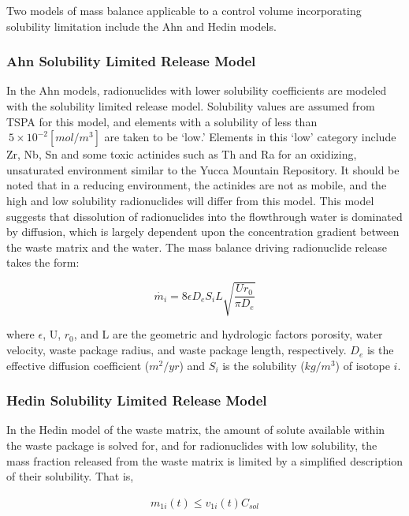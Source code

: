\documentclass[letterpaper]{article}
\begin{document}
Two models of mass balance applicable to a control volume incorporating 
solubility
limitation include the Ahn and Hedin models.

\subsubsection{Ahn Solubility Limited Release Model}

In the Ahn models, radionuclides with lower solubility coefficients are modeled 
with
the solubility limited release model.  Solubility values are assumed from TSPA
for this model, and elements with a solubility of less than $~5\times 10^{-2}
[mol/m^3]$ are taken to be
`low.' Elements in this `low' category include Zr, Nb, Sn and some toxic 
actinides such as Th and Ra for an oxidizing, unsaturated environment similar to 
the Yucca Mountain Repository.
It should be noted that in a reducing environment, the actinides are not as 
mobile, and the high and low solubility radionuclides will differ from this 
model.
This model suggests that dissolution of radionuclides into the flowthrough water 
is dominated by diffusion, which is largely dependent upon the concentration 
gradient between the waste matrix and the water. The mass balance driving 
radionuclide release takes the form:

\begin{equation}
 \dot{m_i}=8\epsilon D_eS_iL\sqrt{\frac{Ur_0}{\pi D_e}}
\end{equation} 

where $\epsilon$, U, $r_0$, and L are the geometric and
hydrologic factors porosity, water velocity, waste package radius, and waste
package length, respectively. $D_e$ is the effective diffusion coefficient
($m^2/yr$)  and $S_i$ is the solubility ($kg/m^3$) of isotope $i$.


\subsubsection{Hedin Solubility Limited Release Model}

In the Hedin model of the waste matrix, the amount of solute available within
the waste package is solved for, and for radionuclides with low solubility, the 
mass
fraction released from the waste matrix is limited by a simplified description
of their solubility. That is, 

\begin{align} m_{1i}(t)\le v_{1i}(t)C_{sol}
\end{align}
\end{document}
